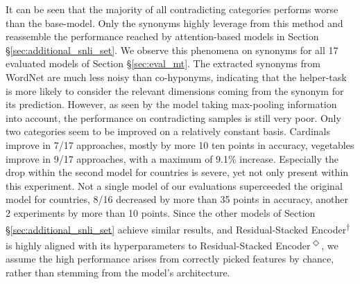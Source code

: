 It can be seen that the majority of all contradicting categories performs worse than the base-model. Only the synonyms highly leverage from this method and reassemble the performance reached by attention-based models in Section §\ref{sec:additional_snli_set}. We observe this phenomena on synonyms for all 17 evaluated models of Section §\ref{sec:eval_mt}. The extracted synonyms from WordNet are much less noisy than co-hyponyms, indicating that the helper-task is more likely to consider the relevant dimensions coming from the synonym for its prediction. However, as seen by the model taking max-pooling information into account, the performance on contradicting samples is still very poor. Only two categories seem to be improved on a relatively constant basis. Cardinals improve in 7/17 approaches, mostly by more 10 ten points in accuracy, vegetables improve in 9/17 approaches, with a maximum of 9.1\% increase. Especially the drop within the second model for countries is severe, yet not only present within this experiment. Not a single model of our evaluations superceeded the original model for countries, 8/16 decreased by more than 35 points in accuracy, another 2 experiments by more than 10 points. Since the other models of Section §\ref{sec:additional_snli_set} achieve similar results, and Residual-Stacked Encoder\textsuperscript{$\dagger$} is highly aligned with its hyperparameters to Residual-Stacked Encoder\textsuperscript{$\Diamond$}, we assume the high performance arises from correctly picked features by chance, rather than stemming from the model's architecture. 

